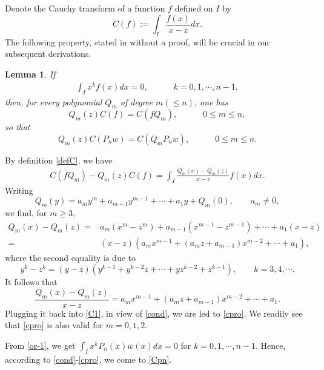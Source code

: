 \documentclass[12pt,a4paper]{article}    %
\makeatletter
\newtheorem{lemma}[theorem]{Lemma}
\renewenvironment{proof}[1][\proofname]{\par
	\pushQED{\qed}%
	\normalfont \topsep6\p@\@plus6\p@\relax
	\trivlist
	\item[\hskip\labelsep
	\itshape #1\@addpunct{.}]\ignorespaces
}{%
	\popQED\endtrivlist\@endpefalse
}
\numberwithin{equation}{section}
\makeatother
\begin{document}
Denote the Cauchy transform of a function $f$ defined on $I$ by
	\begin{equation}\label{defC}		 C(f):=\int_{I}\frac{f(x)}{x-z}dx.
		\end{equation}
The following property, stated in \cite[p.55-p.56]{WvA18} without a proof, will be crucial in our subsequent derivations.
\begin{lemma}
If
\begin{align}\label{cond}
\int_{I}x^{k}f(x)dx=0,\quad\qquad k=0,1,\cdots,n-1,
\end{align}
then, for every polynomial $Q_{m}$ of degree $m (\le n)$, one has
	\begin{equation}\label{cpro}
	Q_{m}(z)C(f)=C(f Q_{m}),\quad\qquad 0\leq m\leq n,
	\end{equation}
so that
\begin{equation}\label{Cpn}
Q_{m}(z)C(P_nw)=C(Q_mP_{n}w),\quad\qquad 0\leq m\leq n.
\end{equation}

\end{lemma}

\begin{proof}
By definition \eqref{defC}, we have
\begin{align}\label{C1}
C(f Q_{m})-Q_{m}(z)C(f)=\int_{I}\frac{Q_m(x)-Q_m(z)}{x-z}f(x)dx.
\end{align}
Writing
 \[Q_m(y)=a_my^m+a_{m-1}y^{m-1}+\cdots+a_1y+Q_m(0),\qquad a_m\neq0,\]
we find, for $m\geq3$,
\begin{align*}
Q_m(x)-Q_m(z)=&a_m\left(x^m-z^m\right)+a_{m-1}(x^{m-1}-z^{m-1})+\cdots+a_1(x-z)\\
=&(x-z)\left(a_mx^{m-1}+(a_mz+a_{m-1})x^{m-2}+\cdots+a_1\right),
\end{align*}
where the second equality is due to
\[y^k-z^k=(y-z)(y^{k-1}+y^{k-2}z+\cdots+yz^{k-2}+z^{k-1}),\qquad k=3,4,\cdots.\]
It follows that
\[\frac{Q_m(x)-Q_m(z)}{x-z}=a_mx^{m-1}+(a_mz+a_{m-1})x^{m-2}+\cdots+a_1.\]
Plugging it back into \eqref{C1}, in view of \eqref{cond}, we are led to \eqref{cpro}. We readily see that \eqref{cpro} is also valid for $m=0,1,2$.

From \eqref{or-1}, we get
$\int_I x^kP_n(x)w(x)dx=0$ for $k=0,1,\cdots,n-1.$
Hence, according to \eqref{cond}-\eqref{cpro}, we come to \eqref{Cpn}.
\end{proof}
\end{document}
